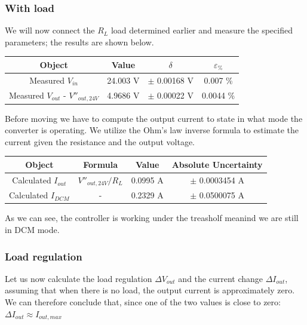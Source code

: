 \documentclass[../main.tex]{subfiles}
\begin{document}
\subsubsection*{With load}

We will now connect the $R_L$ load determined earlier and measure the specified parameters; the results are shown below.

\begin{center}
\begin{tabular}{c c c c}
\textbf{Object} & \textbf{Value} & $\delta$ & $\varepsilon_{\%}$  \\

\hline
Measured $V_{in}$ &  24.003 V & $\pm$  0.00168 V & 0.007 \% \\ 
\hline
Measured $V_{out}$ - $V''_{out,24V}$  &  4.9686 V  & $\pm$ 0.00022 V & 0.0044 \%  \\ 
\end{tabular}
\end{center}


Before moving we have to compute the output current to state in what mode the converter is operating. We utilize the Ohm's law inverse formula to estimate the current given the resistance and the output voltage.

\begin{center}
\begin{tabular}{c c c c}
\textbf{Object} & \textbf{Formula} & \textbf{Value} & \textbf{Absolute Uncertainty} \\

\hline
Calculated $I_{out}$ & $V''_{out,24V} / R_L$ & 0.0995 A & $\pm$ 0.0003454  A \\ 
Calculated $I_{DCM}$ & - & 0.2329 A & $\pm$  0.0500075 A \\ 

\end{tabular}
\end{center}

As we can see, the controller is working under the treasholf meanind we are still in DCM mode.

\subsubsection*{Load regulation}


Let us now calculate the load regulation $\Delta V_{out}$ and the current change $\Delta I_{out}$, assuming that when there is no load, the output current is approximately zero. We can therefore conclude that, since one of the two values is close to zero: $\Delta I_{out} \approx I_{out,max}$
\end{document}
